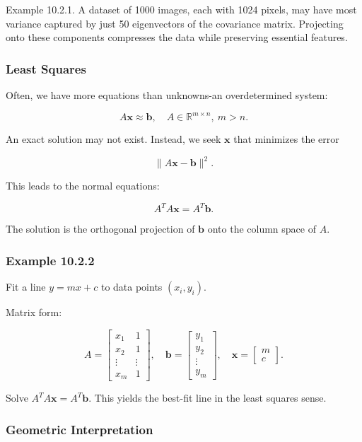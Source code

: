 \documentclass[
  12pt,
  a4paper,
]{article}
\begin{document}
Example 10.2.1. A dataset of 1000 images, each with 1024 pixels, may
have most variance captured by just 50 eigenvectors of the covariance
matrix. Projecting onto these components compresses the data while
preserving essential features.

\subsubsection{Least Squares}\label{least-squares}

Often, we have more equations than unknowns-an overdetermined system:

\[A\mathbf{x} \approx \mathbf{b}, \quad A \in \mathbb{R}^{m \times n}, \ m > n.\]

An exact solution may not exist. Instead, we seek \(\mathbf{x}\) that
minimizes the error

\[\|A\mathbf{x} - \mathbf{b}\|^2.\]

This leads to the normal equations:

\[A^T A \mathbf{x} = A^T \mathbf{b}.\]

The solution is the orthogonal projection of \(\mathbf{b}\) onto the
column space of \(A\).

\subsubsection{Example 10.2.2}\label{example-1022}

Fit a line \(y = mx + c\) to data points \((x_i, y_i)\).

Matrix form:

\[A = \begin{bmatrix}
x_1 & 1 \\
x_2 & 1 \\
\vdots & \vdots \\
x_m & 1
\end{bmatrix}, 
\quad 
\mathbf{b} = \begin{bmatrix} y_1 \\ y_2 \\ \vdots \\ y_m \end{bmatrix},
\quad 
\mathbf{x} = \begin{bmatrix} m \\ c \end{bmatrix}.\]

Solve \(A^T A \mathbf{x} = A^T \mathbf{b}\). This yields the best-fit
line in the least squares sense.

\subsubsection{Geometric
Interpretation}\label{geometric-interpretation-24}
\end{document}
